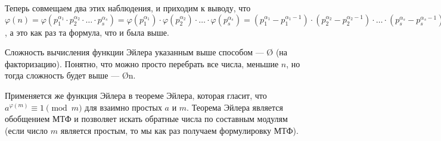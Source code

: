 Теперь совмещаем два этих наблюдения, и приходим к выводу, что $\varphi(n) = \varphi( p_1^{\alpha_1} \cdot p_2^{\alpha_2} \cdot \ldots \cdot p_s^{\alpha_s} ) = \varphi(p_1^{\alpha_1}) \cdot \varphi(p_2^{\alpha_2}) \cdot \ldots \cdot \varphi(p_s^{\alpha_s}) = (p_1^{\alpha_1} - p_1^{\alpha_1 - 1}) \cdot (p_2^{\alpha_2} - p_2^{\alpha_2 - 1}) \cdot \ldots \cdot (p_s^{\alpha_s} - p_s^{\alpha_s - 1})$, а это как раз та формула, что и была выше.

Сложность вычисления функции Эйлера указанным выше способом — \O{} (на факторизацию). Понятно, что можно просто перебрать все числа, меньшие $n$, но тогда сложность будет выше — \O{n}.

Применяется же функция Эйлера в теореме Эйлера, которая гласит, что $a^{\varphi(m)} \equiv 1 {\pmod{m}}$ для взаимно простых $a$ и $m$. Теорема Эйлера является обобщением МТФ и позволяет искать обратные числа по составным модулям (если число $m$ является простым, то мы как раз получаем формулировку МТФ).
